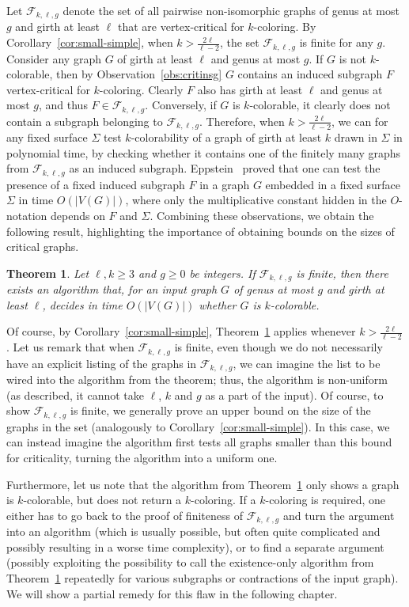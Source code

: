 \documentclass[12pt,twoside,openright,a4paper]{book}
\newtheorem{theorem}{Theorem}[chapter]
\newcommand{\FF}{\mathcal{F}}
\begin{document}
Let $\FF_{k,\ell,g}$ denote the set of all pairwise non-isomorphic graphs of genus at most $g$ and girth at least $\ell$
that are vertex-critical for $k$-coloring.  By Corollary~\ref{cor:small-simple}, when $k>\tfrac{2\ell}{\ell-2}$,
the set $\FF_{k,\ell,g}$ is finite for any $g$.  Consider any graph $G$ of girth at least $\ell$ and genus at most $g$.  If $G$ is not
$k$-colorable, then by Observation~\ref{obs:critinsg} $G$ contains an induced subgraph $F$ vertex-critical for $k$-coloring.
Clearly $F$ also has girth at least $\ell$ and genus at most $g$, and thus $F\in\FF_{k,\ell,g}$.  Conversely, if $G$ is $k$-colorable,
it clearly does not contain a subgraph belonging to $\FF_{k,\ell,g}$.  Therefore, when $k>\tfrac{2\ell}{\ell-2}$,
we can for any fixed surface $\Sigma$ test $k$-colorability of a graph of girth at least $k$ drawn in $\Sigma$ in polynomial
time, by checking whether it contains one of the finitely many graphs from $\FF_{k,\ell,g}$ as an induced subgraph.
Eppstein~\cite{eppstein00} proved that one can test the presence of a fixed induced subgraph $F$ in a graph $G$ embedded in a fixed surface $\Sigma$
in time $O(|V(G)|)$, where only the multiplicative constant hidden in the $O$-notation depends on $F$ and $\Sigma$.
Combining these observations, we obtain the following result, highlighting the importance of obtaining bounds on the sizes of critical graphs.
\begin{theorem}\label{thm:crittoalg}
Let $\ell,k\ge 3$ and $g\ge 0$ be integers.  If $\FF_{k,\ell,g}$ is finite, then there exists an algorithm that,
for an input graph $G$ of genus at most $g$ and girth at least $\ell$, decides in time $O(|V(G)|)$ whether $G$ is $k$-colorable.
\end{theorem}
Of course, by Corollary~\ref{cor:small-simple}, Theorem~\ref{thm:crittoalg} applies whenever $k>\tfrac{2\ell}{\ell-2}$.
Let us remark that when $\FF_{k,\ell,g}$ is finite, even though we do not necessarily have an explicit listing of the graphs in $\FF_{k,\ell,g}$,
we can imagine the list to be wired into the algorithm from the theorem; thus, the algorithm is non-uniform (as described, it cannot
take $\ell$, $k$ and $g$ as a part of the input).  Of course, to show $\FF_{k,\ell,g}$ is finite, we generally prove an
upper bound on the size of the graphs in the set (analogously to Corollary~\ref{cor:small-simple}).  In this case, we can
instead imagine the algorithm first tests all graphs smaller than this bound for criticality, turning the algorithm into a uniform one.

Furthermore, let us note that the algorithm from Theorem~\ref{thm:crittoalg} only shows a graph is $k$-colorable, but does not return
a $k$-coloring.  If a $k$-coloring is required, one either has to go back to the proof of finiteness of $\FF_{k,\ell,g}$ and turn
the argument into an algorithm (which is usually possible, but often quite complicated and possibly resulting in a worse time complexity),
or to find a separate argument (possibly exploiting the possibility to call the existence-only algorithm from Theorem~\ref{thm:crittoalg}
repeatedly for various subgraphs or contractions of the input graph).  We will show a partial remedy for this flaw in the following chapter.
\end{document}
